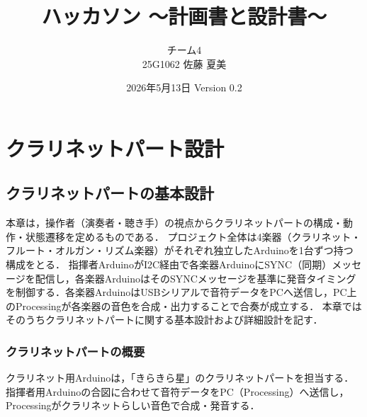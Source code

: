 \documentclass[uplatex,dvipdfmx,report]{jlreq}
\begin{document}
\title{ハッカソン 〜計画書と設計書〜}
\author{
  チーム4 \\
  25G1062 佐藤 夏美 \\
}
\date{2026年5月13日 Version 0.2}
\maketitle
\clearpage

\tableofcontents
\clearpage


\part{クラリネットパート設計}

\chapter{クラリネットパートの基本設計}

本章は，操作者（演奏者・聴き手）の視点からクラリネットパートの構成・動作・状態遷移を定めるものである．
プロジェクト全体は4楽器（クラリネット・フルート・オルガン・リズム楽器）がそれぞれ独立したArduinoを1台ずつ持つ構成をとる．
指揮者ArduinoがI2C経由で各楽器ArduinoにSYNC（同期）メッセージを配信し，各楽器ArduinoはそのSYNCメッセージを基準に発音タイミングを制御する．各楽器ArduinoはUSBシリアルで音符データをPCへ送信し，PC上のProcessingが各楽器の音色を合成・出力することで合奏が成立する．
本章ではそのうちクラリネットパートに関する基本設計および詳細設計を記す．





\section{クラリネットパートの概要}

クラリネット用Arduinoは，「きらきら星」のクラリネットパートを担当する．
指揮者用Arduinoの合図に合わせて音符データをPC（Processing）へ送信し，Processingがクラリネットらしい音色で合成・発音する．






\end{document}
